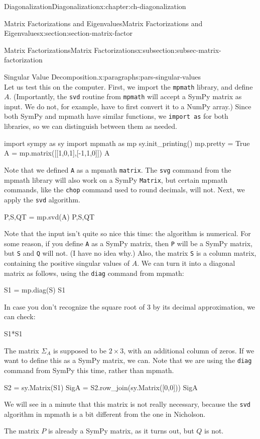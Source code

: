 \documentclass[oneside,10pt,]{book}
\newcommand{\mono}[1]{\texttt{#1}}
\numberwithin{equation}{section}
\begin{document}
\begin{chapterptx}{Diagonalization}{}{Diagonalization}{}{}{x:chapter:ch-diagonalization}
\begin{sectionptx}{Matrix Factorizations and Eigenvalues}{}{Matrix Factorizations and Eigenvalues}{}{}{x:section:section-matrix-factor}
\begin{subsectionptx}{Matrix Factorizations}{}{Matrix Factorizations}{}{}{x:subsection:subsec-matrix-factorization}
\begin{paragraphs}{Singular Value Decomposition.}{x:paragraphs:pars-singular-values}
\begin{equation*}
\end{equation*}
Let us test this on the computer. First, we import the \mono{mpmath} library, and define \(A\). (Importantly, the \mono{svd} routine from \mono{mpmath} will accept a SymPy matrix as input. We do not, for example, have to first convert it to a NumPy array.) Since both SymPy and mpmath have similar functions, we \mono{import as}  for both libraries, so we can distinguish between them as needed.%
\begin{sageinput}
import sympy as sy
import mpmath as mp
sy.init_printing()
mp.pretty = True
A = mp.matrix([[1,0,1],[-1,1,0]])
A
\end{sageinput}
Note that we defined \mono{A} as a mpmath \mono{matrix}. The \mono{svg} command from the mpmath library will also work on a SymPy \mono{Matrix}, but certain mpmath commands, like the \mono{chop} command used to round decimals, will not. Next, we apply the \mono{svd} algorithm.%
\begin{sageinput}
P,S,QT = mp.svd(A)
P,S,QT
\end{sageinput}
Note that the input isn't quite so nice this time: the algorithm is numerical. For some reason, if you define \mono{A} as a SymPy matrix, then \mono{P} will be a SymPy matrix, but \mono{S} and \mono{Q} will not. (I have no idea why.) Also, the matrix \mono{S} is a column matrix, containing the positive singular values of \(A\). We can turn it into a diagonal matrix as follows, using the \mono{diag} command from mpmath:%
\begin{sageinput}
S1 = mp.diag(S)
S1
\end{sageinput}
In case you don't recognize the square root of 3 by its decimal approximation, we can check:%
\begin{sageinput}
S1*S1
\end{sageinput}
The matrix \(\Sigma_A\) is supposed to be \(2\times 3\), with an additional column of zeros. If we want to define this as a SymPy matrix, we can. Note that we are using the \mono{diag} command from SymPy this time, rather than mpmath.%
\begin{sageinput}
S2 = sy.Matrix(S1)
SigA = S2.row_join(sy.Matrix([0,0]))
SigA
\end{sageinput}
We will see in a minute that this matrix is not really necessary, because the \mono{svd} algorithm in mpmath is a bit different from the one in Nicholson.%
\par
The matrix \(P\) is already a SymPy matrix, as it turns out, but \(Q\) is not.%
\begin{sageinput}

\end{sageinput}
\end{paragraphs}
\end{subsectionptx}
\end{sectionptx}
\end{chapterptx}
\end{document}
